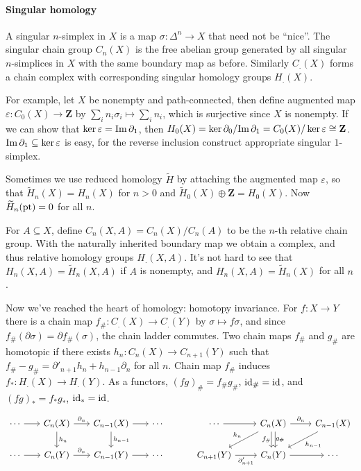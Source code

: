 \documentclass[11pt]{article}
\theoremstyle{definition}
\theoremstyle{plain}
\newcommand{\id}{\textup{id}}
\newcommand{\im}{\textup{Im}\,}
\newcommand{\Z}{\mathbf{Z}}
\newcommand{\pt}{\textup{pt}}
\newcommand{\1}{\mathbf{1}}
\begin{document}
\paragraph{Singular homology}

A singular $n$-simplex in $X$ is a map $\sigma:\Delta^n\to X$ that need not be ``nice''. The singular chain group $C_n(X)$ is the free abelian group generated by all singular $n$-simplices in $X$ with the same boundary map as before. Similarly $C_.(X)$ forms a chain complex with corresponding singular homology groups $H_.(X)$.\medbreak

For example, let $X$ be nonempty and path-connected, then define augmented map $\varepsilon:C_0(X)\to\Z$ by $\sum_in_i\sigma_i\mapsto\sum_in_i$, which is surjective since $X$ is nonempty. If we can show that $\ker\varepsilon=\im\partial_1$, then $H_0(X)=\ker\partial_0/\im\partial_1=C_0(X)/\ker\varepsilon\cong\Z$. $\im\partial_1\subseteq\ker\varepsilon$ is easy, for the reverse inclusion construct appropriate singular $1$-simplex.\medbreak

Sometimes we use reduced homology $\widetilde{H}$ by attaching the augmented map $\varepsilon$, so that $\widetilde{H}_n(X)=H_n(X)$ for $n>0$ and $\widetilde{H}_0(X)\oplus\Z=H_0(X)$. Now $\widetilde{H}_n(\pt)=0$ for all $n$.\medbreak

For $A\subseteq X$, define $C_n(X,A)=C_n(X)/C_n(A)$ to be the $n$-th relative chain group. With the naturally inherited boundary map we obtain a complex, and thus relative homology groups $H_.(X,A)$. It's not hard to see that $H_n(X,A)=\widetilde{H}_n(X,A)$ if $A$ is nonempty, and $H_n(X,A)=\widetilde{H}_n(X)$ for all $n$.\medbreak

Now we've reached the heart of homology: homotopy invariance. For $f:X\to Y$ there is a chain map $f_\#:C_.(X)\to C_.(Y)$ by $\sigma\mapsto f\sigma$, and since $f_\#(\partial\sigma)=\partial f_\#(\sigma)$, the chain ladder commutes. Two chain maps $f_\#$ and $g_\#$ are homotopic if there exists $h_n:C_n(X)\to C_{n+1}(Y)$ such that $f_\#-g_\#=\partial'_{n+1}h_n+h_{n-1}\partial_n$ for all $n$. Chain map $f_\#$ induces $f_\ast:H_.(X)\to H_.(Y)$. As a functors, $(fg)_\#=f_\#g_\#$, $\id_\#=\id$, and $(fg)_\ast=f_\ast g_\ast$, $\id_\ast=\id$.

\[\begin{tikzcd}[column sep=scriptsize]
\cdots\arrow{r}&C_n(X)\arrow{d}{h_n}\arrow{r}{\partial_n}&C_{n-1}(X)\arrow{d}{h_{n-1}}\arrow{r}&\cdots\\
\cdots\arrow{r}&C_n(Y)\arrow{r}{\partial_n}&C_{n-1}(Y)\arrow{r}&\cdots
\end{tikzcd}\quad\quad\quad\begin{tikzcd}
\cdots\arrow[r]&C_n(X)\arrow[d,xshift=0.5ex,"f_\#"'{xshift=-0.6ex}]\arrow[d,xshift=-0.5ex,"g_\#"{xshift=0.6ex}]\arrow[swap]{dl}{h_n}\arrow{r}{\partial_n}&C_{n-1}(X)\arrow{dl}{h_{n-1}}\\
C_{n+1}(Y)\arrow[swap]{r}{\partial'_{n+1}}&C_n(Y)\arrow[r]&\cdots
\end{tikzcd}\]
\end{document}
